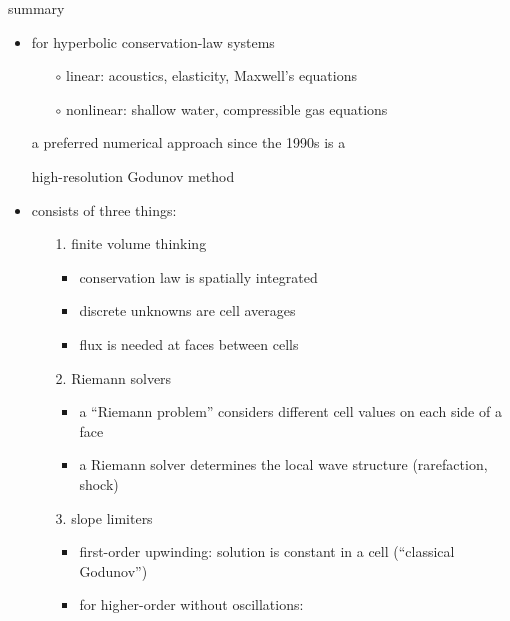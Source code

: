 \documentclass[10pt,hyperref,dvipsnames]{beamer}
\begin{document}
\begin{frame}{summary}

\begin{itemize}
\item for hyperbolic conservation-law systems
    \begin{itemize}
    \item[$\circ$] linear: acoustics, elasticity, Maxwell's equations
    \item[$\circ$] nonlinear: shallow water, compressible gas equations
    \end{itemize}
a preferred numerical approach since the 1990s is a
\begin{center}
\alert{high-resolution Godunov method}
\end{center}
\item consists of three things:
    \begin{itemize}
    \item[\alert{1.}] \alert{finite volume thinking}
        \begin{itemize}
        \item conservation law is spatially integrated
        \item discrete unknowns are cell averages
        \item flux is needed at faces between cells
        \end{itemize}
    \item[\alert{2.}] \alert{Riemann solvers}
        \begin{itemize}
        \item a ``Riemann problem'' considers different cell values on each side of a face
        \item a Riemann solver determines the local wave structure (rarefaction, shock)
        \end{itemize}
    \item[\alert{3.}] \alert{slope limiters}
        \begin{itemize}
        \item first-order upwinding: solution is constant in a cell (``classical Godunov'')
        \item for higher-order without oscillations:
        \end{itemize}
    \end{itemize}
\end{itemize}
\end{frame}
\end{document}
